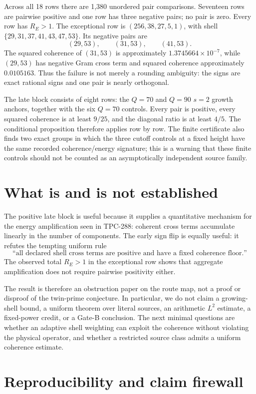 \documentclass[10pt]{article}
\begin{document}
Across all 18 rows there are 1,380 unordered pair comparisons.  Seventeen
rows are pairwise positive and one row has three negative pairs; no pair is
zero.  Every row has $R_E>1$.  The exceptional row is
$(256,38,27,5,1)$, with shell
$\{29,31,37,41,43,47,53\}$.  Its negative pairs are
\[
 (29,53),\qquad(31,53),\qquad(41,53).
\]
The squared coherence of $(31,53)$ is approximately
$1.3745664\times10^{-7}$, while $(29,53)$ has negative Gram cross term and
squared coherence approximately $0.0105163$.  Thus the failure is not merely
a rounding ambiguity: the signs are exact rational signs and one pair is
nearly orthogonal.

The late block consists of eight rows: the $Q=70$ and $Q=90$ $s=2$ growth
anchors, together with the six $Q=70$ controls.  Every pair is positive,
every squared coherence is at least $9/25$, and the diagonal ratio is at least
$4/5$.  The conditional proposition therefore applies row by row.  The
finite certificate also finds two exact groups in which the three cutoff
controls at a fixed height have the same recorded coherence/energy signature;
this is a warning that these finite controls should not be counted as an
asymptotically independent source family.

\section{What is and is not established}

The positive late block is useful because it supplies a quantitative mechanism
for the energy amplification seen in TPC-288: coherent cross terms accumulate
linearly in the number of components.  The early sign flip is equally useful:
it refutes the tempting uniform rule
\[
 \text{``all declared shell cross terms are positive and have a fixed
 coherence floor.''}
\]
The observed total $R_E>1$ in the exceptional row shows that aggregate
amplification does not require pairwise positivity either.

The result is therefore an obstruction paper on the route map, not a proof or
disproof of the twin-prime conjecture.  In particular, we do not claim a
growing-shell bound, a uniform theorem over literal sources, an arithmetic
$L^2$ estimate, a fixed-power credit, or a Gate-B conclusion.  The next
minimal questions are whether an adaptive shell weighting can exploit the
coherence without violating the physical operator, and whether a restricted
source class admits a uniform coherence estimate.

\section{Reproducibility and claim firewall}
\end{document}
